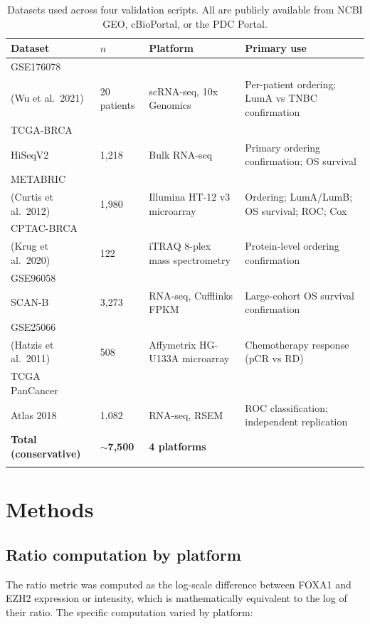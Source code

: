 \documentclass[12pt, a4paper]{article}
\begin{document}
\begin{longtable}{p{3.2cm}p{1.2cm}p{2.8cm}p{5cm}}
\toprule
\textbf{Dataset} & \textbf{$n$} & \textbf{Platform}
& \textbf{Primary use} \\
\midrule
\endhead
GSE176078\\(Wu et al.\ 2021)
  & 20 patients & scRNA-seq, 10x Genomics
  & Per-patient ordering; LumA vs TNBC confirmation \\[0.3em]
TCGA-BRCA\\HiSeqV2
  & 1,218 & Bulk RNA-seq
  & Primary ordering confirmation; OS survival \\[0.3em]
METABRIC\\(Curtis et al.\ 2012)
  & 1,980 & Illumina HT-12 v3 microarray
  & Ordering; LumA/LumB; OS survival; ROC; Cox \\[0.3em]
CPTAC-BRCA\\(Krug et al.\ 2020)
  & 122 & iTRAQ 8-plex mass spectrometry
  & Protein-level ordering confirmation \\[0.3em]
GSE96058\\SCAN-B
  & 3,273 & RNA-seq, Cufflinks FPKM
  & Large-cohort OS survival confirmation \\[0.3em]
GSE25066\\(Hatzis et al.\ 2011)
  & 508 & Affymetrix HG-U133A microarray
  & Chemotherapy response (pCR vs RD) \\[0.3em]
TCGA PanCancer\\Atlas 2018
  & 1,082 & RNA-seq, RSEM
  & ROC classification; independent replication \\
\midrule
\textbf{Total (conservative)} & $\sim$\textbf{7,500}
  & \textbf{4 platforms} & \\
\bottomrule
\caption{Datasets used across four validation scripts.
All are publicly available from NCBI GEO, cBioPortal,
or the PDC Portal.}
\end{longtable}

\section{Methods}

\subsection{Ratio computation by platform}

The ratio metric was computed as the log-scale difference
between FOXA1 and EZH2 expression or intensity, which is
mathematically equivalent to the log of their ratio. The
specific computation varied by platform:
\end{document}
